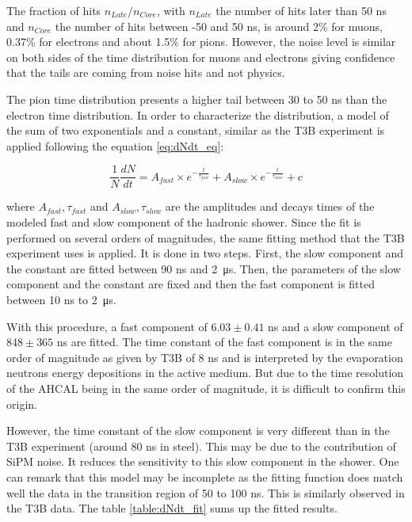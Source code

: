 The fraction of hits $n_{Late}/n_{Core}$, with $n_{Late}$ the number of hits later than 50 ns and $n_{Core}$ the number of hits between -50 and 50 ns, is around 2\% for muons, 0.37\% for electrons and about 1.5\% for pions. However, the noise level is similar on both sides of the time distribution for muons and electrons giving confidence that the tails are coming from noise hits and not physics.

The pion time distribution presents a higher tail between 30 to 50 ns than the electron time distribution. In order to characterize the distribution, a model of the sum of two exponentials and a constant, similar as the T3B experiment \cite{Simon2013} is applied following the equation \ref{eq:dNdt_eq}:

\begin{equation} \label{eq:dNdt_eq}
	\frac{1}{N}\frac{dN}{dt} = A_{fast} \times e^{-\frac{t}{\tau_{fast}}} + A_{slow} \times e^{-\frac{t}{\tau_{slow}}} + c
\end{equation}

where $A_{fast}, \tau_{fast}$ and $A_{slow}, \tau_{slow}$ are the amplitudes and decays times of the modeled fast and slow component of the hadronic shower. Since the fit is performed on several orders of magnitudes, the same fitting method that the T3B experiment uses is applied. It is done in two steps. First, the slow component and the constant are fitted between 90 ns and \SI{2}{\micro\second}. Then, the parameters of the slow component and the constant are fixed and then the fast component is fitted between 10 ns to \SI{2}{\micro\second}.

With this procedure, a fast component of $6.03 \pm 0.41$ ns and a slow component of $848 \pm 365$ ns are fitted. The time constant of the fast component is in the same order of magnitude as given by T3B of 8 ns and is interpreted by the evaporation neutrons energy depositions in the active medium. But due to the time resolution of the AHCAL being in the same order of magnitude, it is difficult to confirm this origin.

However, the time constant of the slow component is very different than in the T3B experiment (around 80 ns in steel). This may be due to the contribution of SiPM noise. It reduces the sensitivity to this slow component in the shower. One can remark that this model may be incomplete as the fitting function does match well the data in the transition region of 50 to 100 ns. This is similarly observed in the T3B data. The table \ref{table:dNdt_fit} sums up the fitted results.

